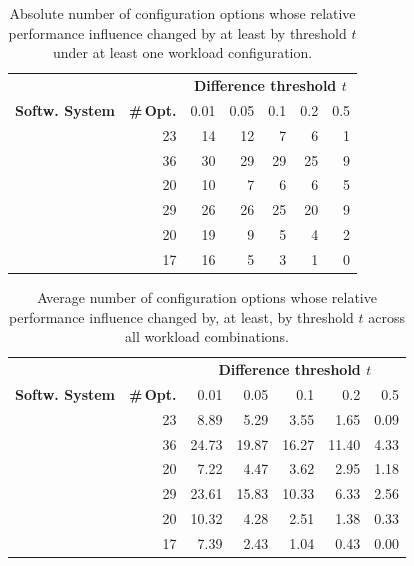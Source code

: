 \begin{table}
	\centering
	\caption{Absolute number of configuration options whose relative performance influence changed by at least by threshold $t$ under at least one workload configuration.}
	\begin{tabular}{lr|rrrrr}
		\toprule
		& &  \multicolumn{5}{c}{\textbf{Difference threshold $t$}} \\
		\textbf{Softw. System} & \textbf{\#\,Opt.} & 0.01 &  0.05 &  0.1 &  0.2 &  0.5 \\
		\midrule
		\dconvert & 23 &    14 &    12 &    7 &    6 &    1 \\
		\jumper & 36 &   30 &    29 &   29 &   25 &    9 \\
		\batik &  20 &  10 &     7 &    6 &    6 &    5 \\
		\kanzi & 29 &   26 &    26 &   25 &   20 &    9 \\
		\jadx & 20 &   19 &     9 &    5 &    4 &    2 \\
		\htwo & 17 &   16 &     5 &    3 &    1 &    0 \\
		\bottomrule
	\end{tabular}
	\label{tab:total_changes}
\end{table}
\begin{table}
	\caption{Average number of configuration options whose relative performance influence changed by, at least, by threshold $t$ across all workload combinations.}
	\begin{tabular}{lr|rrrrr}
		\toprule
		& & \multicolumn{5}{c}{\textbf{Difference threshold $t$}} \\
		\textbf{Softw. System} & \textbf{\#\,Opt.} & 0.01 &  0.05 &  0.1 &  0.2 &  0.5 \\
		\midrule
		\dconvert & 23 &  8.89 &  5.29 &  3.55 &  1.65 & 0.09 \\
		\jumper & 36 & 24.73 & 19.87 & 16.27 & 11.40 & 4.33 \\
		\batik & 20 &  7.22 &  4.47 &  3.62 &  2.95 & 1.18 \\
		\kanzi & 29 & 23.61 & 15.83 & 10.33 &  6.33 & 2.56 \\
		\jadx & 20 & 10.32 &  4.28 &  2.51 &  1.38 & 0.33 \\
		\htwo & 17 & 7.39 &  2.43 &  1.04 &  0.43 & 0.00 \\
		\bottomrule
	\end{tabular}
	\label{tab:average_changes}
\end{table}

